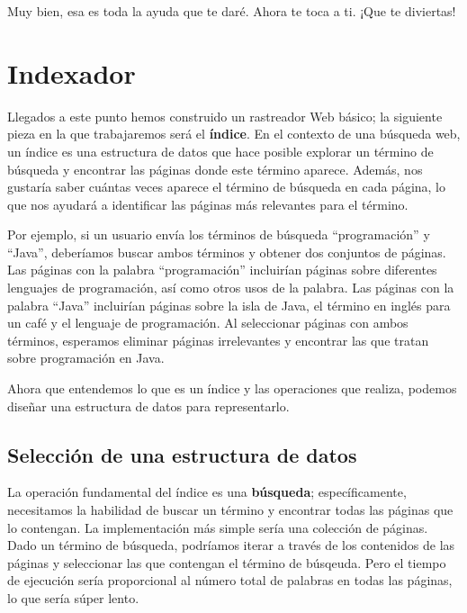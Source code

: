 \documentclass[12pt]{book}
\theoremstyle{exercise}
\begin{document}
Muy bien, esa es toda la ayuda que te daré. Ahora te toca a ti.
¡Que te diviertas!



\chapter{Indexador}

Llegados a este punto hemos construido un rastreador Web básico; la siguiente
pieza en la que trabajaremos será el \textbf{índice}. En el contexto de una búsqueda
web, un índice es una estructura de datos que hace posible explorar un término de búsqueda
y encontrar las páginas donde este término aparece. Además, nos gustaría saber
cuántas veces aparece el término de búsqueda en cada página, lo que nos
ayudará a identificar las páginas más relevantes para el término.


Por ejemplo, si un usuario envía los términos de búsqueda ``programación'' y ``Java'', deberíamos buscar ambos términos y obtener dos conjuntos de
páginas. Las páginas con la palabra ``programación'' incluirían páginas sobre
diferentes lenguajes de programación, así como otros usos de la palabra. 
Las páginas con la palabra ``Java'' incluirían páginas sobre la isla de Java,
el término en inglés para un café y el lenguaje de programación. Al seleccionar
páginas con ambos términos, esperamos eliminar páginas irrelevantes y encontrar
las que tratan sobre programación en Java.

Ahora que entendemos lo que es un índice y las operaciones que
realiza, podemos diseñar una estructura de datos para representarlo.


\section{Selección de una estructura de datos}
\label{data-structure-selection}

La operación fundamental del índice es una \textbf{búsqueda};
específicamente, necesitamos la habilidad de buscar un término y encontrar
todas las páginas que lo contengan. La implementación más simple sería una
colección de páginas. Dado un término de búsqueda, podríamos iterar a través
de los contenidos de las páginas y seleccionar las que contengan el término
de búsqeuda. Pero el tiempo de ejecución sería proporcional al número total
de palabras en todas las páginas, lo que sería súper lento.
\end{document}
